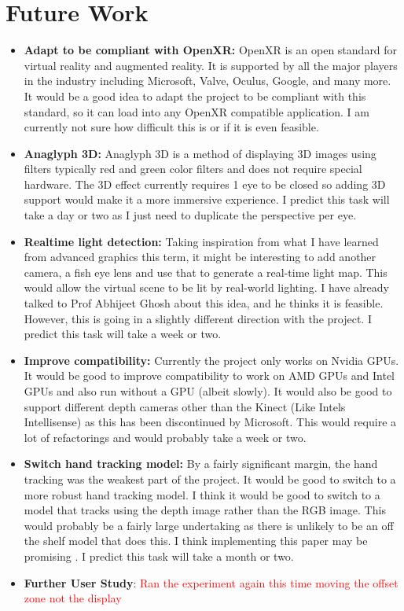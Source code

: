 \section{Future Work}
\begin{itemize}
    \item \textbf{Adapt to be compliant with OpenXR:} OpenXR is an open standard for virtual reality and augmented reality. It is supported by all the major players in the industry including Microsoft, Valve, Oculus, Google, and many more. It would be a good idea to adapt the project to be compliant with this standard, so it can load into any OpenXR compatible application. I am currently not sure how difficult this is or if it is even feasible.

    \item \textbf{Anaglyph 3D:} Anaglyph 3D is a method of displaying 3D images using filters typically red and green color filters and does not require special hardware. The 3D effect currently requires 1 eye to be closed so adding 3D support would make it a more immersive experience. I predict this task will take a day or two as I just need to duplicate the perspective per eye.

    \item \textbf{Realtime light detection:} Taking inspiration from what I have learned from advanced graphics this term, it might be interesting to add another camera, a fish eye lens and use that to generate a real-time light map. This would allow the virtual scene to be lit by real-world lighting. I have already talked to Prof Abhijeet Ghosh about this idea, and he thinks it is feasible. However, this is going in a slightly different direction with the project. I predict this task will take a week or two.

    \item \textbf{Improve compatibility:} Currently the project only works on Nvidia GPUs. It would be good to improve compatibility to work on AMD GPUs and Intel GPUs and also run without a GPU (albeit slowly). It would also be good to support different depth cameras other than the Kinect (Like Intels Intellisense) as this has been discontinued by Microsoft. This would require a lot of refactorings and would probably take a week or two.
    
	\item \textbf{Switch hand tracking model:} By a fairly significant margin, the hand tracking was the weakest part of the project. It would be good to switch to a more robust hand tracking model. I think it would be good to switch to a model that tracks using the depth image rather than the RGB image. This would probably be a fairly large undertaking as there is unlikely to be an off the shelf model that does this. I think implementing this paper may be promising \tocite. I predict this task will take a month or two.
	
	\item \textbf{Further User Study}: \textcolor{red}{Ran the experiment again this time moving the offset zone not the display}
\end{itemize}

